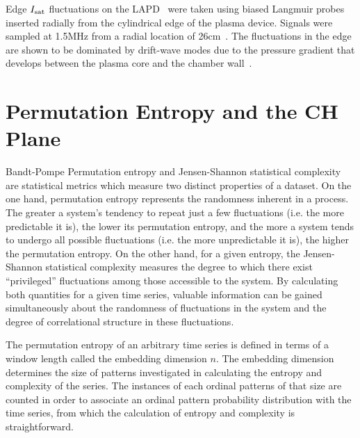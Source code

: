 \documentclass[aps,prx,twocolumn,secnumarabic,nobalancelastpage,amsmath,amssymb,
nofootinbib]{revtex4-1}
\begin{document}
Edge $I_{\rm sat}$ fluctuations on the LAPD~\cite{gekelman1991} were taken using biased Langmuir probes inserted radially from the cylindrical edge of the plasma device. Signals were sampled at 1.5MHz from a radial location of 26cm~\cite{schaffner2012}. The fluctuations in the edge are shown to be dominated by drift-wave modes due to the pressure gradient that develops between the plasma core and the chamber wall~\cite{maggs1996}.

\section{Permutation Entropy and the CH Plane}
Bandt-Pompe Permutation entropy and Jensen-Shannon statistical complexity are statistical metrics which measure two distinct properties of a dataset. On the one hand, permutation entropy represents the randomness inherent in a process. The greater a system’s tendency to repeat just a few fluctuations (i.e. the more predictable it is), the lower its permutation entropy, and the more a system tends to undergo all possible fluctuations (i.e. the more unpredictable it is), the higher the permutation entropy. On the other hand, for a given entropy, the Jensen-Shannon statistical complexity measures the degree to which there exist “privileged” fluctuations among those accessible to the system. By calculating both quantities for a given time series, valuable information can be gained simultaneously about the randomness of fluctuations in the system and the degree of correlational structure in these fluctuations. 

The permutation entropy of an arbitrary time series is defined in terms of a window length called the embedding dimension $n$. The embedding dimension determines the size of patterns investigated in calculating the entropy and complexity of the series. The instances of each ordinal patterns of that size are counted in order to associate an ordinal pattern probability distribution with the time series, from which the calculation of entropy and complexity is straightforward.
\end{document}
